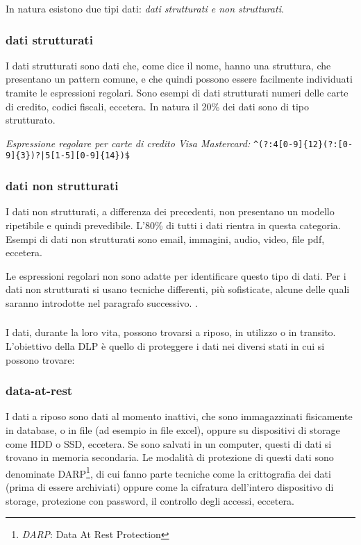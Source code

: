     In natura esistono due tipi dati: \textit{dati strutturati e non strutturati}.
        \subsubsection{dati strutturati}
            I dati strutturati sono dati che, come dice il nome, hanno una struttura, che presentano un pattern comune, e che 
            quindi possono essere facilmente individuati tramite le espressioni regolari. 
            Sono esempi di dati strutturati numeri delle carte di credito, codici fiscali, eccetera.
            In natura il 20\% dei dati sono di tipo strutturato. 
    
            \begin{center} 
                \textit{Espressione regolare per carte di credito Visa Mastercard:}
                \verb/^(?:4[0-9]{12}(?:[0-9]{3})?|5[1-5][0-9]{14})$/ 
            \end{center}

        \subsubsection{dati non strutturati}
            I dati non strutturati, a differenza dei precedenti, non presentano un modello ripetibile
            e quindi prevedibile. L'80\% di tutti i dati rientra in questa categoria. Esempi di dati non 
            strutturati sono email, immagini, audio, video, file pdf, eccetera. 
    
    Le espressioni regolari non sono adatte per identificare questo tipo di dati. %
    Per i dati non strutturati si usano tecniche differenti, più sofisticate, alcune delle quali saranno introdotte nel paragrafo successivo. \cite{DLP3}.

    \subsubsection*{}
    I dati, durante la loro vita, possono trovarsi a riposo, in utilizzo o in transito.
    L'obiettivo della DLP è quello di proteggere i dati nei diversi stati in cui si possono trovare:
    \cite{DLP1}

    \subsubsection{data-at-rest}
        I dati a riposo sono dati al momento inattivi, che sono immagazzinati fisicamente in database,
        o in file (ad esempio in file excel), oppure su dispositivi di storage come HDD o SSD, eccetera.
        Se sono salvati in un computer, questi di dati si trovano in memoria secondaria.
        Le modalità di protezione di questi dati sono denominate DARP\footnote{\textit{DARP}: Data At Rest Protection}, 
        di cui fanno parte tecniche come la crittografia dei dati (prima di essere archiviati) oppure come la cifratura
        dell'intero dispositivo di storage, protezione con password, il controllo degli accessi, eccetera.

